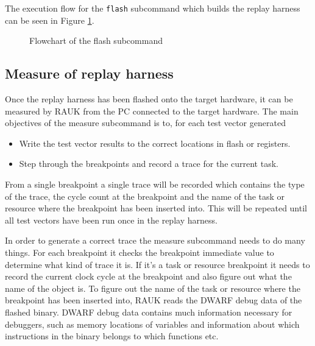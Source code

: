 The execution flow for the \texttt{flash} subcommand which builds the replay
harness can be seen in Figure \ref{fig:flashcmd}.
\begin{figure}[H]
    \centering
    \caption{Flowchart of the flash subcommand}
    \label{fig:flashcmd}
\end{figure}

\subsection{Measure of replay harness}
Once the replay harness has been flashed onto the target hardware, it can
be measured by RAUK from the PC connected to the target hardware. The main
objectives of the measure subcommand is to, for each test vector generated
\begin{itemize}
   \item Write the test vector results to the correct locations in flash or registers.
   \item Step through the breakpoints and record a trace for the current task.
\end{itemize}
From a single breakpoint a single trace will be recorded which contains the
type of the trace, the cycle count at the breakpoint and the name of the task
or resource where the breakpoint has been inserted into. This will be repeated
until all test vectors have been run once in the replay harness.

In order to generate a correct trace the measure subcommand needs to do many
things. For each breakpoint it checks the breakpoint immediate value to
determine what kind of trace it is. If it's a task or resource breakpoint it
needs to record the current clock cycle at the breakpoint and also figure out
what the name of the object is. To figure out the name of the task or resource
where the breakpoint has been inserted into, RAUK reads the
DWARF\cite{dwarfspec} debug data of the flashed binary. DWARF debug data
contains much information necessary for debuggers, such as memory locations of
variables and information about which instructions in the binary belongs to
which functions etc.


